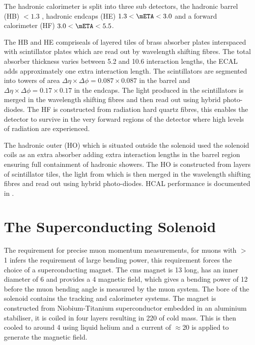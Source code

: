 The hadronic calorimeter is split into three sub detectors, the hadronic
barrel (HB) \mETA $< 1.3$ , hadronic endcaps (HE) $1.3 < \mETA < 3.0$ and a
forward calorimeter (HF) $3.0 < \mETA < 5.5$.

The HB and HE compriseals of layered tiles of brass absorber plates
interspaced with scintillator plates which are read out by wavelength shifting
fibres. The total absorber thickness varies between 5.2 and 10.6 interaction
lengths, the ECAL adds approximately one extra interaction length. The
scintillators are segmented into towers of area $\Delta\eta\times\Delta\phi =
0.087\times0.087$ in the barrel and $\Delta\eta\times\Delta\phi =
0.17\times0.17$ in the endcaps. The light produced in the scintillators is
merged in the wavelength shifting fibres and then read out using hybrid
photo-diodes. The HF is constructed from radiation hard quartz fibres, this
enables the detector to survive in the very forward regions of the detector
where high levels of radiation are experienced.

The hadronic outer (HO) which is situated outside the solenoid used the
solenoid coils as an extra absorber adding extra interaction lengths in the
barrel region ensuring full containment of hadronic showers. The HO is
constructed from layers of scintillator tiles, the light from which is then merged in the wavelength shifting fibres and read out using hybrid photo-diodes.
HCAL performance is documented in .


\section{The Superconducting Solenoid} %
\label{sec:the_cms_super_conducting_solenoid}
The requirement for precise muon momentum measurements, for muons with \PT $>$
\unit{1}{\TeV} infers the requirement of large bending power, this requirement
forces the choice of a superconducting magnet. The \ac{cms} magnet is
\unit{13}{\meter} long, has an inner diameter of \unit{6}{\meter} and provides
a \unit{4}{\tesla} magnetic field, which gives a bending power of
\unit{12}{\tesla\meter} before the muon bending angle is measured by the muon
system. The bore of the solenoid contains the tracking and calorimeter systems.
The magnet is constructed from Niobium-Titanium superconductor embedded in an
aluminium stabiliser, it is coiled in four layers resulting in \unit{220}{\ton} 
of cold mass. This is then cooled to around \unit{4}{\kelvin} using liquid 
helium and a current of $\approx$\unit{20}{\kilo\ampere} is applied to generate 
the magnetic field.

